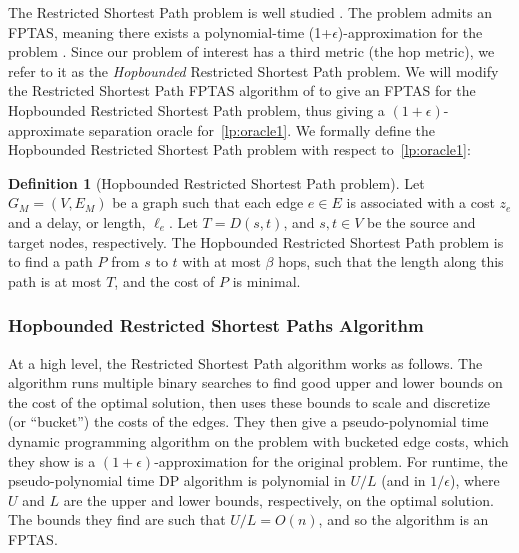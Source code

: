 \documentclass{article}
\theoremstyle{definition}
\newtheorem{definition}{Definition}
\theoremstyle{remark}
\begin{document}
The Restricted Shortest Path problem is well studied \cite{Has92, War87, Phi93, XZTT08, HK18}. The problem admits an FPTAS, meaning there exists a polynomial-time (1+$\epsilon$)-approximation for the problem \cite{LR01}. Since our problem of interest has a third metric (the hop metric), we refer to it as the \textit{Hopbounded} Restricted Shortest Path problem. We \iflong will \else \fi modify the Restricted Shortest Path FPTAS algorithm of \cite{LR01} to give an FPTAS for the Hopbounded Restricted Shortest Path problem, thus giving a $(1+\epsilon)$-approximate separation oracle for~\ref{lp:oracle1}. We formally define the Hopbounded Restricted Shortest Path problem with respect to~\ref{lp:oracle1}:

\begin{definition}[Hopbounded Restricted Shortest Path problem]
    Let $G_M = (V,E_M)$ be a graph such that each edge $e \in E$ is associated with a cost $z_e$ and a delay, or length, $\ell_e$. Let $T = D(s,t)$, and $s,t \in V$ be the source and target nodes, respectively. The Hopbounded Restricted Shortest Path problem is to find a path $P$ from $s$ to $t$ with at most $\beta$ hops, such that the length along this path is at most $T$, and the cost of $P$ is minimal.
\end{definition}

\subsubsection{Hopbounded Restricted Shortest Paths Algorithm}
At a high level, the Restricted Shortest Path algorithm works as follows. The algorithm runs multiple binary searches to find good upper and lower bounds on the cost of the optimal solution, then uses these bounds to scale and discretize (or ``bucket'') the costs of the edges. They then give a pseudo-polynomial time dynamic programming algorithm on the problem with bucketed edge costs, which they show is a $(1+\epsilon)$-approximation for the original problem. For runtime, the pseudo-polynomial time DP algorithm is polynomial in $U/L$ (and in $1/\epsilon$), where $U$ and $L$ are the upper and lower bounds, respectively, on the optimal solution. The bounds they find are such that $U/L = O(n)$, and so the algorithm is an FPTAS. 
\end{document}
